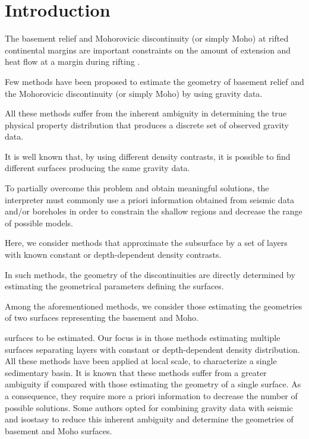 \documentclass[manuscript]{geophysics}
\begin{document}
\section{Introduction}


The basement relief and Mohorovicic discontinuity (or simply Moho) at rifted 
continental margins are important constraints on the amount of extension and 
heat flow at a margin during rifting \citep{watts-fairhead1999}.

Few methods have been proposed to estimate the geometry of basement relief
and the Mohorovicic discontinuity (or simply Moho) by using gravity data.

All these methods suffer from the inherent ambiguity \citep{skeels1947, roy1962} in
determining the true physical property distribution that produces a discrete set of
observed gravity data. 

It is well known that, by using different density contrasts, 
it is possible to find different surfaces producing the same gravity data. 

To partially overcome this problem and obtain meaningful solutions, the interpreter
must commonly use a priori information obtained from seismic data and/or boreholes in
order to constrain the shallow regions and decrease the range of possible models.

Here, we consider methods that approximate the subsurface by a set of layers 
with known constant or depth-dependent density contrasts. 



In such methods, the geometry of the discontinuities are directly 
determined by estimating the geometrical parameters defining the surfaces.

Among the aforementioned methods, we consider those estimating the geometries of
two surfaces representing the basement and Moho.

surfaces to be estimated. Our focus is in those methods estimating multiple surfaces
separating layers with constant or depth-dependent density distribution.
All these methods have been applied at local scale, to characterize a single 
sedimentary basin.
It is known that these methods suffer from a greater ambiguity if compared with 
those estimating the geometry of a single surface.
As a consequence, they require more a priori information to
decrease the number of possible solutions. 
Some authors opted for combining gravity data with seismic and isostasy 
to reduce this inherent ambiguity and determine the geometries of basement and Moho surfaces.
\end{document}
